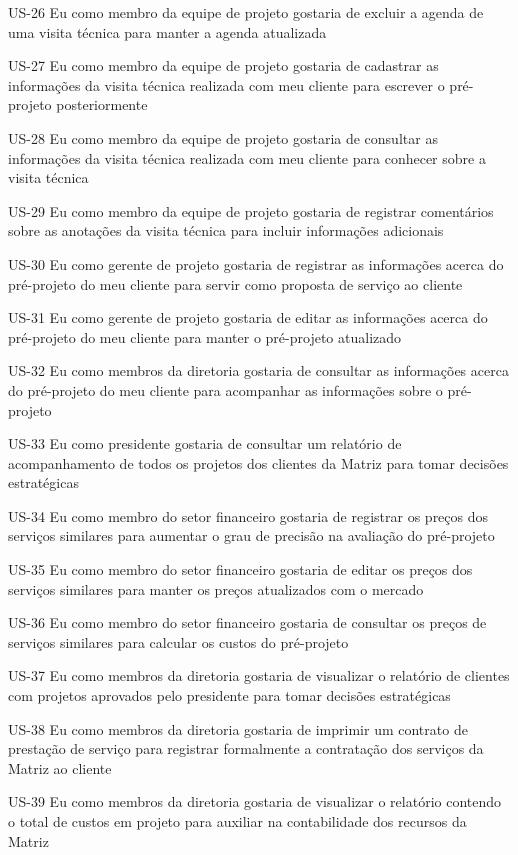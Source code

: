 US-26 Eu como membro da equipe de projeto gostaria de excluir a agenda de uma visita técnica para manter a agenda atualizada


US-27 Eu como membro da equipe de projeto gostaria de cadastrar as informações da visita técnica realizada com meu cliente para escrever o pré-projeto posteriormente


US-28 Eu como membro da equipe de projeto gostaria de consultar as informações da visita técnica realizada com meu cliente para conhecer sobre a visita técnica


US-29 Eu como membro da equipe de projeto gostaria de registrar comentários sobre as anotações da visita técnica para incluir informações adicionais


US-30 Eu como gerente de projeto gostaria de registrar as informações acerca do pré-projeto do meu cliente para servir como proposta de serviço ao cliente


US-31 Eu como gerente de projeto gostaria de editar as informações acerca do pré-projeto do meu cliente para manter o pré-projeto atualizado


US-32 Eu como membros da diretoria gostaria de consultar as informações acerca do pré-projeto do meu cliente para acompanhar as informações sobre o pré-projeto


US-33 Eu como presidente gostaria de consultar um relatório de acompanhamento de todos os projetos dos clientes da Matriz para tomar decisões estratégicas


US-34 Eu como membro do setor financeiro gostaria de registrar os preços dos serviços similares para aumentar o grau de precisão na avaliação do pré-projeto


US-35 Eu como membro do setor financeiro gostaria de editar os preços dos serviços similares para manter os preços atualizados com o mercado


US-36 Eu como membro do setor financeiro gostaria de consultar os preços de serviços similares para calcular os custos do pré-projeto


US-37 Eu como membros da diretoria gostaria de visualizar o relatório de clientes com projetos aprovados pelo presidente para tomar decisões estratégicas


US-38 Eu como membros da diretoria gostaria de imprimir um contrato de prestação de serviço para registrar formalmente a contratação dos serviços da Matriz ao cliente


US-39 Eu como membros da diretoria gostaria de visualizar o relatório contendo o total de custos em projeto para auxiliar na contabilidade dos recursos da Matriz


